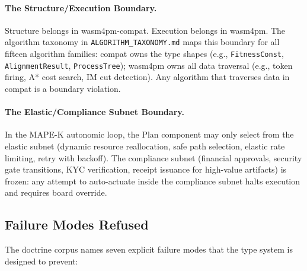 \paragraph{The Structure/Execution Boundary.}
Structure belongs in wasm4pm-compat. Execution belongs in wasm4pm. The algorithm taxonomy in
\texttt{ALGORITHM\_TAXONOMY.md} maps this boundary for all fifteen algorithm families: compat
owns the type shapes (e.g., \texttt{FitnessConst}, \texttt{AlignmentResult},
\texttt{ProcessTree}); wasm4pm owns all data traversal (e.g., token firing, A* cost search,
IM cut detection). Any algorithm that traverses data in compat is a boundary violation.

\paragraph{The Elastic/Compliance Subnet Boundary.}
In the MAPE-K autonomic loop, the Plan component may only select from the elastic subnet
(dynamic resource reallocation, safe path selection, elastic rate limiting, retry with
backoff). The compliance subnet (financial approvals, security gate transitions, KYC
verification, receipt issuance for high-value artifacts) is frozen: any attempt to
auto-actuate inside the compliance subnet halts execution and requires board override.

\subsection{Failure Modes Refused}
\label{sec:doctrine-architecture-failures}

The doctrine corpus names seven explicit failure modes that the type system is designed to
prevent:

